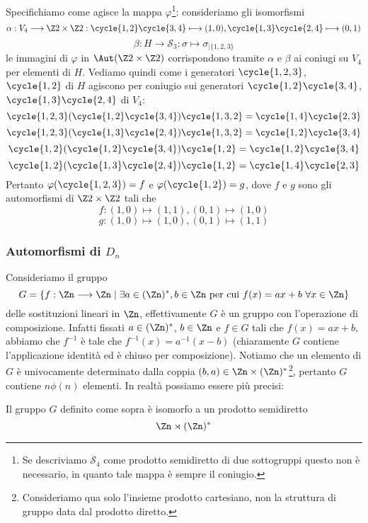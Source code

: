 \documentclass[11pt]{scrartcl}
\begin{document}
	Specifichiamo come agisce la mappa $\varphi$\footnote{Se descriviamo $\mathcal{S}_4$ 
		come prodotto semidiretto di due sottogruppi questo non è 
		necessario, in quanto tale mappa è sempre il coniugio.
	}:
	consideriamo gli isomorfismi
	\[
	\alpha: V_4\longrightarrow \Z2\times\Z2: \cycle{1, 2}\cycle{3, 4}\longmapsto (1, 0),
	\cycle{1, 3}\cycle{2, 4} \longmapsto (0, 1)
	\]
	\[
	\beta: H \longrightarrow \mathcal{S}_3: \sigma \longmapsto \sigma_{\mid\{1, 2, 3\}}
	\]
	le immagini di $\varphi$ in $\Aut(\Z2\times\Z2)$ corrispondono tramite $\alpha$
	e $\beta$ ai coniugi su $V_4$ per elementi di $H$. Vediamo quindi come
	i generatori $\cycle{1, 2, 3}$, $\cycle{1, 2}$ di $H$ agiscono per coniugio
	sui generatori $\cycle{1, 2}\cycle{3, 4}$, $\cycle{1, 3}\cycle{2, 4}$ di $V_4$:
	\[
	\cycle{1, 2, 3}(\cycle{1, 2}\cycle{3, 4})\cycle{1, 3, 2} = \cycle{1, 4}\cycle{2, 3}
	\]
	\[
	\cycle{1, 2, 3}(\cycle{1, 3}\cycle{2, 4})\cycle{1, 3, 2} = \cycle{1, 2}\cycle{3, 4}
	\]
	\[
	\cycle{1, 2}(\cycle{1, 2}\cycle{3, 4})\cycle{1, 2} = \cycle{1, 2}\cycle{3, 4}
	\]
	\[
	\cycle{1, 2}(\cycle{1, 3}\cycle{2, 4})\cycle{1, 2} = \cycle{1, 4}\cycle{2, 3}
	\]
	Pertanto $\varphi(\cycle{1, 2, 3}) = f$ e $\varphi(\cycle{1, 2}) = g$,
	dove $f$ e $g$ sono gli automorfismi di $\Z2\times\Z2$ tali che
	\[
	f: (1, 0)\longmapsto (1, 1), (0, 1) \longmapsto (1, 0)
	\]
	\[
	g: (1, 0)\longmapsto (1, 0), (0, 1) \longmapsto (1, 1)
	\]
	
	\subsubsection{Automorfismi di $D_n$}
	
	Consideriamo il gruppo 
	\[
	G = \{f: \Zn\longrightarrow\Zn\mid \exists a \in (\Zn)^*, b \in \Zn\text{ per cui }
	f(x) = ax + b~\forall x \in \Zn\}
	\]
	delle sostituzioni lineari in $\Zn$, effettivamente $G$ è un gruppo con 
	l'operazione di composizione. Infatti fissati $a \in (\Zn)^*$, $b \in \Zn$ e
	$f \in G$ tali che $f(x) = ax + b$, abbiamo che $f^{-1}$ è tale che 
	$f^{-1}(x) = a^{-1}(x - b)$ (chiaramente $G$ contiene l'applicazione identità 
	ed è chiuso per composizione). Notiamo che un elemento di $G$ è univocamente
	determinato dalla coppia $(b, a) \in \Zn \times (\Zn)^*$\footnote{
		Consideriamo qua solo l'insieme prodotto cartesiano, non la struttura di 
		gruppo data dal prodotto diretto.
	}, pertanto $G$
	contiene $n\phi(n)$ elementi. In realtà possiamo essere più precisi:
	
	\begin{proposition}
		Il gruppo $G$ definito come sopra è isomorfo a un prodotto semidiretto 
		\[
		\Zn \rtimes (\Zn)^*
		\]
	\end{proposition}
	
\end{document}
